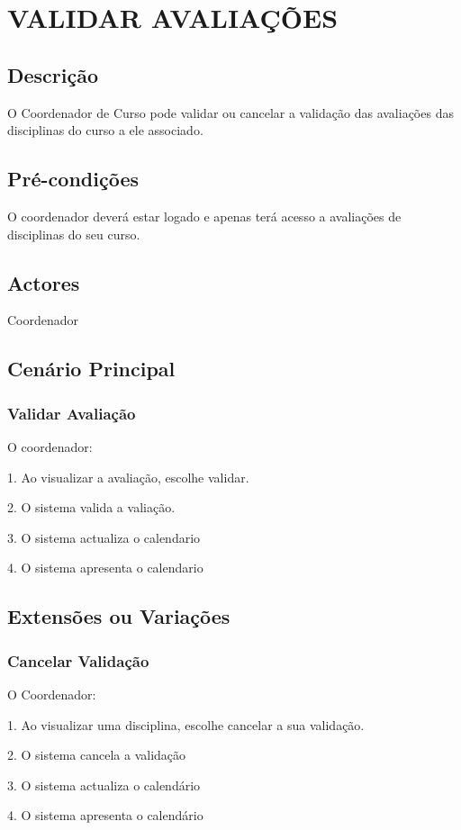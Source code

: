 \section{VALIDAR AVALIAÇÕES}

\subsection{Descrição}
O Coordenador de Curso pode validar ou cancelar a validação das avaliações das disciplinas do curso a ele associado.

\subsection{Pré-condições}
O coordenador deverá estar logado e apenas terá acesso a avaliações de disciplinas do seu curso.

\subsection{Actores}
Coordenador

\subsection{Cenário Principal}

\subsubsection{Validar Avaliação} 
O coordenador:

1. Ao visualizar a avaliação, escolhe validar.

2. O sistema valida a valiação.

3. O sistema actualiza o calendario

4. O sistema apresenta o calendario


\subsection{Extensões ou Variações} 
\subsubsection{Cancelar Validação}

O Coordenador:

1. Ao visualizar uma disciplina, escolhe cancelar a sua validação.

2. O sistema cancela a validação

3. O sistema actualiza o calendário

4. O sistema apresenta o calendário